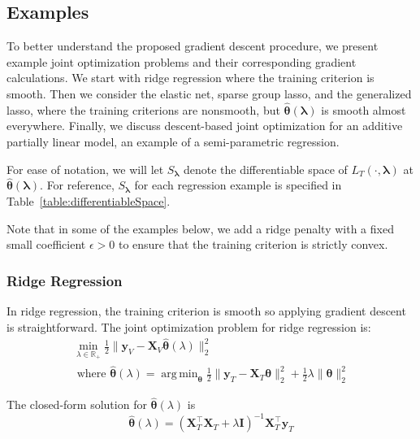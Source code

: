 \documentclass[12pt,letterpaper]{article}
\DeclareMathOperator*{\argmin}{arg\,min}
\begin{document}
\subsection{Examples}\label{exampleSection}

To better understand the proposed gradient descent procedure, we present example joint optimization problems and their corresponding gradient calculations. We start with ridge regression where the training criterion is smooth. Then we consider the elastic net, sparse group lasso, and the generalized lasso, where the training criterions are nonsmooth, but $\hat{\boldsymbol \theta}(\boldsymbol\lambda)$ is smooth almost everywhere. Finally, we discuss descent-based joint optimization for an additive partially linear model, an example of a semi-parametric regression.

For ease of notation, we will let $S_{\boldsymbol{\lambda}}$ denote the differentiable space of $L_T(\cdot, \boldsymbol{\lambda})$ at $\hat{\boldsymbol{\theta}}(\boldsymbol{\lambda})$. For reference, $S_{\boldsymbol{\lambda}}$ for each regression example is specified in Table~\ref{table:differentiableSpace}. 

Note that in some of the examples below, we add a ridge penalty with a fixed small coefficient $\epsilon > 0$ to ensure that the training criterion is strictly convex.

\subsubsection{Ridge Regression}

In ridge regression, the training criterion is smooth so applying gradient descent is straightforward. The joint optimization problem for ridge regression is:
\begin{equation}
\begin{array}{c}
\min_{\lambda\in \mathbb{R}_{+}} \frac{1}{2} \| \boldsymbol{y}_V - \boldsymbol{X}_V \hat{\boldsymbol{\theta}} (\lambda) \|_2 ^2 \\
\text{  where  } \hat{\boldsymbol{\theta}} (\lambda) = \argmin_{\boldsymbol{\theta}} \frac{1}{2} \| \boldsymbol{y}_T - \boldsymbol{X}_T \boldsymbol{\theta} \|_2 ^2 + \frac{1}{2} \lambda \| \boldsymbol{\theta} \|_2^2
\end{array}
\end{equation}

The closed-form solution for $\hat{\boldsymbol{\theta}}(\lambda)$ is
\begin{equation}
\hat{\boldsymbol{\theta}} (\lambda) = (\boldsymbol{X}_T^\top\boldsymbol{X}_T + \lambda \boldsymbol{I})^{-1}\boldsymbol{X}_T^\top\boldsymbol{y}_T
\end{equation}
\end{document}
